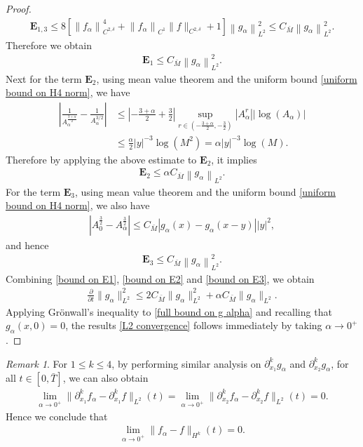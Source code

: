 \documentclass[reqno]{amsart}%
\theoremstyle{definition}
\theoremstyle{remark}
\newtheorem{rem}[thm]{Remark}
\numberwithin{equation}{section}
\newcommand{\0}{\mathbf{0}}
\newcommand{\1}{\mathbf{1}}
\numberwithin{equation}{section}
\numberwithin{theorem}{section}
\numberwithin{figure}{section}
\begin{document}
\begin{proof}
\begin{align*}
\mathbf{E}_{1,3}\le 8\left[\left\|f_{\alpha}\right\|_{C^{2, \delta}}^{4}+\left\|f_{\alpha}\right\|_{C^{1}}\|f\|_{C^{2, \delta}}+1\right]\left\|g_{\alpha}\right\|_{L^{2}}^{2}\le C_{\bar{M}}\left\|g_{\alpha}\right\|_{L^{2}}^{2}.
\end{align*} 
Therefore we obtain
\begin{align}\label{bound on E1}
\mathbf{E}_{1}\le C_{\bar{M}}\left\|g_{\alpha}\right\|_{L^{2}}^{2}.
\end{align}
Next for the term $\mathbf{E}_2$, using mean value theorem and the uniform bound \eqref{uniform bound on H4 norm}, we have
\begin{align*}
\left|\frac{1}{A_{\alpha}^{\frac{3+\alpha}{2}}}-\frac{1}{A_{\alpha}^{3 / 2}}\right|&\le\left|-\frac{3+\alpha}{2}+\frac{3}{2}\right|\sup_{r\in(-\frac{3+\alpha}{2},-\frac{3}{2})}|A_{\alpha}^r||\log(A_\alpha)|\\
&\le\frac{\alpha}{2}|y|^{-3}\log(M^2)=\alpha|y|^{-3}\log(M).
\end{align*}
Therefore by applying the above estimate to $\mathbf{E}_2$, it implies
\begin{align}\label{bound on E2}
\mathbf{E}_2\le \alpha C_{\bar{M}}\left\|g_{\alpha}\right\|_{L^{2}}.
\end{align}
For the term $\mathbf{E}_3$, using mean value theorem and the uniform bound \eqref{uniform bound on H4 norm}, we also have
\begin{align*}
|A_{0}^\frac{3}{2}-A_{\alpha}^\frac{3}{2}|\le C_{\bar{M}}|g_{\alpha}(x)-g_{\alpha}(x-y)||y|^2,
\end{align*}
and hence
\begin{align}\label{bound on E3}
\mathbf{E}_3\le C_{\bar{M}}\left\|g_{\alpha}\right\|_{L^{2}}^{2}.
\end{align}
Combining \eqref{bound on E1}, \eqref{bound on E2} and \eqref{bound on E3}, we obtain
\begin{align}\label{full bound on g alpha}
\frac{\partial}{\partial t}\|g_{\alpha}\|^2_{L^2}\le 2C_{\bar{M}}\|g_{\alpha}\|^2_{L^2}+\alpha C_{\bar{M}}\|g_{\alpha}\|_{L^2}.
\end{align}
Applying Gr\"{o}nwall's inequality to \eqref{full bound on g alpha} and recalling that $g_{\alpha}(x,0)=0$, the results \eqref{L2 convergence} follows immediately by taking $\alpha\to0^{+}$.
\end{proof}
\begin{rem}\label{rem on Hk convergence}
For $1\le k\le 4$, by performing similar analysis on $\partial^k_{x_1} g_\alpha$ and $\partial^k_{x_2} g_\alpha$, for all $t\in[0,\bar{T}]$, we can also obtain
\begin{align*}
\lim_{\alpha\to0^+}\|\partial^k_{x_1}f_\alpha - \partial^k_{x_1}f\|_{L^2}(t)=\lim_{\alpha\to0^+}\|\partial^k_{x_2}f_\alpha - \partial^k_{x_2}f\|_{L^2}(t)=0.
\end{align*}
Hence we conclude that
\begin{align}\label{Hk convergence}
\lim_{\alpha\to0^+}\|f_\alpha - f\|_{H^k}(t)=0.
\end{align}
\end{rem}
\end{document}
